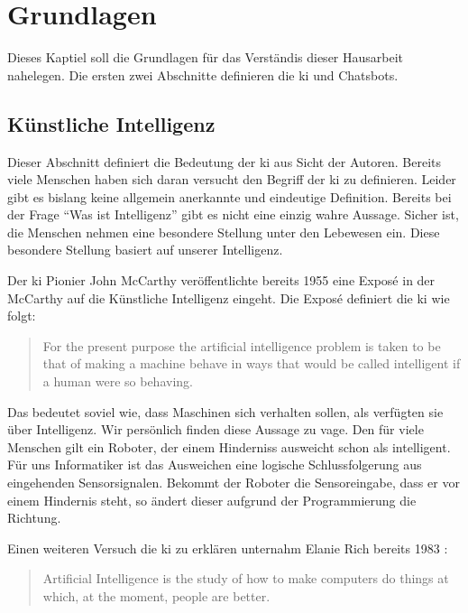 \section{Grundlagen}
Dieses Kaptiel soll die Grundlagen für das Verständis dieser Hausarbeit nahelegen. Die ersten zwei Abschnitte definieren die \ac{ki} und Chatsbots. 

\subsection{Künstliche Intelligenz}
Dieser Abschnitt definiert die Bedeutung der \ac{ki} aus Sicht der Autoren. Bereits viele Menschen haben sich daran versucht den Begriff der \ac{ki} zu definieren. Leider gibt es bislang keine allgemein anerkannte und eindeutige Definition. Bereits bei der Frage \enquote{Was ist Intelligenz} gibt es nicht eine einzig wahre Aussage. Sicher ist, die Menschen nehmen eine besondere Stellung unter den Lebewesen ein. Diese besondere Stellung basiert auf unserer Intelligenz. 

Der \ac{ki} Pionier John McCarthy \cite{PROPOSALMcCarthy} veröffentlichte bereits 1955 eine Exposé in der McCarthy auf die Künstliche Intelligenz eingeht. Die Exposé definiert die \ac{ki} wie folgt:
\begin{quote}
		For the present purpose the artificial intelligence problem is taken to be that of making a machine behave in ways that would be called intelligent if a human were so behaving.
\end{quote}
Das bedeutet soviel wie, dass Maschinen sich verhalten sollen, als verfügten sie über Intelligenz. Wir persönlich finden diese Aussage zu vage. Den für viele Menschen gilt ein Roboter, der einem Hinderniss ausweicht schon als intelligent. Für uns Informatiker ist das Ausweichen eine logische Schlussfolgerung aus eingehenden Sensorsignalen. Bekommt der Roboter die Sensoreingabe, dass er vor einem Hindernis steht, so ändert dieser aufgrund der Programmierung die Richtung.

Einen weiteren Versuch die \ac{ki} zu erklären unternahm Elanie Rich bereits 1983 \cite{ArtificialIntelligence}: 
\begin{quote}
		Artificial Intelligence is the study of how to make computers do things at which, at the moment, people are better.
\end{quote}

